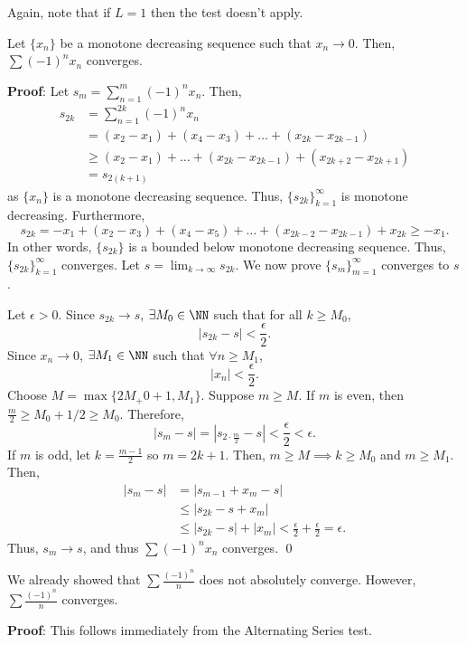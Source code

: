 \begin{remark}
Again, note that if $L = 1$ then the test doesn't apply.
\end{remark}

\begin{theorem}
Let $\{x_n\}$ be a monotone decreasing sequence such that $x_n \to 0.$ Then, $\sum (-1)^n x_n$ converges.
\end{theorem}
\textbf{Proof}: Let $s_m = \sum_{n=1}^m (-1)^n x_n$. Then,
\begin{align*}
    s_{2k} &= \sum_{n=1}^{2k} (-1)^n x_n \\
    &= (x_2 - x_1) + (x_4-x_3) + \dots + (x_{2k} - x_{2k-1}) \\
    &\geq (x_2-x_1) + \dots + (x_{2k}-x_{2k-1}) + (x_{2k+2} -x_{2k+1}) \\
    &= s_{2(k+1)}
\end{align*}
as $\{x_n\}$ is a monotone decreasing sequence. Thus, $\{s_{2k}\}_{k=1}^\infty$ is monotone decreasing. Furthermore, 
\[
s_{2k} = -x_1 + (x_2-x_3) + (x_4-x_5) + \dots + (x_{2k-2}-x_{2k-1}) + x_{2k} \geq -x_1.
\]
In other words, $\{s_{2k}\}$ is a bounded below monotone decreasing sequence. Thus, $\{s_{2k}\}_{k=1}^\infty$ converges. Let $s = \lim_{k\to \infty} s_{2k}.$ We now prove $\{s_m\}_{m=1}^\infty$ converges to $s$.

Let $\epsilon>0$. Since $s_{2k}\to s$, $\exists M_0 \in \NN$ such that for all $k\geq M_0$, 
\[
|s_{2k}-s| < \frac{\epsilon}{2}.
\]
Since $x_n \to 0$, $\exists M_1 \in \NN$ such that $\forall n\geq M_1$, 
\[
|x_n|< \frac{\epsilon}{2}.
\]
Choose $M = \max\{2M_+0+1, M_1\}$. Suppose $m\geq M$. If $m$ is even, then $\frac{m}{2} \geq M_0 + 1/2 \geq M_0$. Therefore, 
\[
|s_m - s| = |s_{2\cdot \frac{m}{2}} - s| < \frac{\epsilon}{2} < \epsilon.
\]
If $m$ is odd, let $k = \frac{m-1}{2}$ so $m = 2k+1$. Then, $m\geq M\implies k\geq M_0$ and $m\geq M_1$. Then,
\begin{align*}
    |s_m-s| &= |s_{m-1} + x_m - s| \\
    &\leq |s_{2k}-s + x_m| \\
    &\leq |s_{2k}-s| + |x_m| < \frac{\epsilon}{2} + \frac{\epsilon}{2} = \epsilon.
\end{align*}
Thus, $s_m\to s$, and thus $\sum (-1)^n x_n$ converges. \qed 

\begin{corollary}
We already showed that $\sum \frac{(-1)^n}{n}$ does not absolutely converge. However, $\sum \frac{(-1)^n}{n}$ converges.
\end{corollary}
\textbf{Proof}: This follows immediately from the Alternating Series test.

